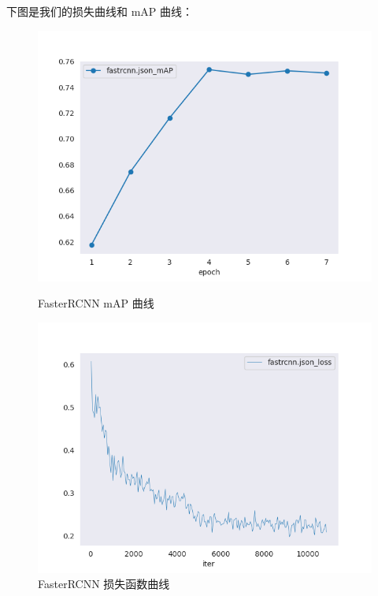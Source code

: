 \documentclass[notitlepage,cs4size,punct,oneside]{ctexrep}
\numberwithin{equation}{chapter}
\theoremstyle{mystyle}
\begin{document}
下图是我们的损失曲线和 mAP 曲线：

\begin{figure}[!htpb]
    \centering
    \begin{minipage}[t]{0.49\textwidth}
    \includegraphics[width=\textwidth]{fastrcnn_mAP.png}
    \caption{FasterRCNN mAP 曲线}
    \label{mAPfrcnn}
    \end{minipage}
    \begin{minipage}[t]{0.49\textwidth}
    \includegraphics[width=\textwidth]{fastrcnn_loss.png}
    \caption{FasterRCNN 损失函数曲线}
    \label{frcnn_loss}
    \end{minipage}
\end{figure}
\end{document}
